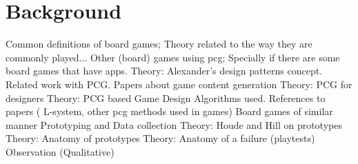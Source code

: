 \section{Background}
Common definitions of board games; Theory related to the way they are commonly played...
Other (board) games using pcg; Specially if there are some board games that have apps. 
Theory: Alexander's design patterns concept.
Related work with PCG.
Papers about game content generation
Theory: PCG for designers
Theory: PCG based Game Design
Algorithms used.
References to papers ( L-system, other pcg methods used in games)
Board games of similar manner
Prototyping and Data collection 
Theory: Houde and Hill on prototypes
Theory: Anatomy of prototypes
Theory: Anatomy of a failure (playtests)
Observation (Qualitative)